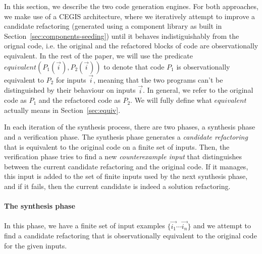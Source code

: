 \documentclass[sigconf,review,anonymous]{acmart}
\begin{document}

In this section, we describe the two code generation engines.
For both approaches, we make use of a CEGIS architecture, where we
iteratively attempt to improve a candidate refactoring (generated using a component library as built in Section~\ref{sec:components-seeding}) until it behaves indistiguishably
from the orignal code, i.e. the original and
the refactored blocks of code are observationally equivalent.
%
In the rest of the paper, we will use the predicate
$equivalent(P_1(\vec{i}), P_2(\vec{i}))$ to denote that code $P_1$ is
observationally equivalent to $P_2$ for inputs $\vec{i}$, meaning that the two programs
can't be distinguished by their behaviour on inputs $\vec{i}$.  In general,
we refer to the original code as $P_1$ and the refactored code as
$P_2$. We will fully define what $equivalent$ actually means in Section~\ref{sec:equiv}.

In each iteration of the synthesis process, there are two phases, a synthesis phase and a verification phase. The synthesis phase generates a {\em candidate refactoring} that is equivalent to
the original code on a finite set of inputs. Then, the verification phase tries to find a new {\em counterexample input} that distinguishes between the current candidate refactoring and the original code. If it manages, this input is added to the set of finite inputs used by the next synthesis phase, and if it fails, then the current candidate is indeed a solution refactoring.


\paragraph{The synthesis phase}
In this phase, we have 
a finite set of input examples $\{\vec{i_1} \cdots \vec{i_n}\}$ and we attempt to find a candidate refactoring
that is observationally equivalent to the original code for the given inputs.
\end{document}
